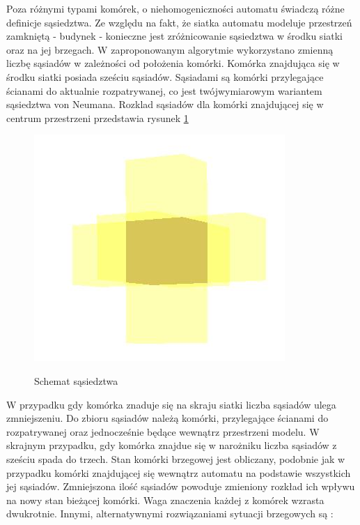 Poza różnymi typami komórek, o niehomogeniczności automatu świadczą różne definicje sąsiedztwa.
Ze względu na fakt, że siatka automatu modeluje przestrzeń zamkniętą - budynek - konieczne jest zróżnicowanie sąsiedztwa w środku siatki oraz na jej brzegach.
W zaproponowanym algorytmie wykorzystano zmienną liczbę sąsiadów w zależności od położenia komórki. 
Komórka znajdująca się w środku siatki posiada sześciu sąsiadów. Sąsiadami są komórki przylegające ścianami do aktualnie
rozpatrywanej, co jest twójwymiarowym wariantem sąsiedztwa von Neumana. %
 Rozklad sąsiadów dla komórki znajdującej się w centrum przestrzeni przedstawia rysunek \ref{sasiedzi}
\begin{figure}
\begin {center}
\includegraphics{sasiedztwo.jpg} \\
\caption { Schemat sąsiedztwa}
\label {sasiedzi}
\end {center}
\end{figure}
W przypadku gdy komórka znaduje się na skraju siatki liczba sąsiadów ulega zmniejszeniu. Do zbioru sąsiadów należą komórki, przylegające ścianami do 
rozpatrywanej oraz jednocześnie będące wewnątrz przestrzeni modelu. W skrajnym przypadku, gdy komórka znajdue się w narożniku liczba sąsiadów z sześciu spada
do trzech. Stan komórki brzegowej jest obliczany, podobnie jak w przypadku komórki znajdującej się wewnątrz automatu na podstawie wszystkich jej sąsiadów. Zmniejszona ilość sąsiadów powoduje zmieniony rozkład ich wpływu na nowy stan bieżącej komórki. Waga znaczenia każdej z komórek wzrasta dwukrotnie.
Innymi, alternatywnymi rozwiązaniami sytuacji brzegowych są :
